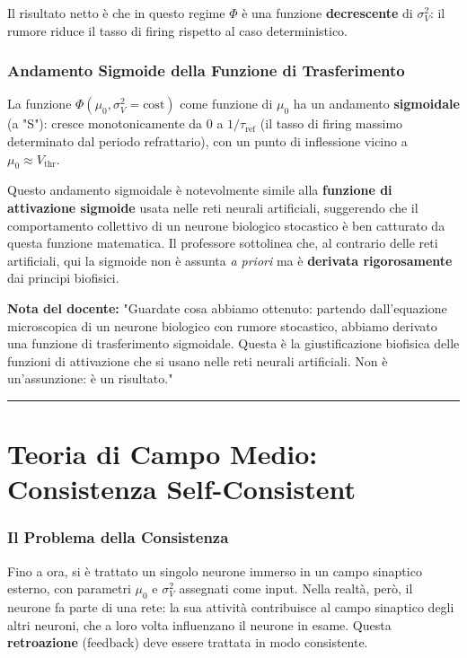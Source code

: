 Il risultato netto è che in questo regime $\Phi$ è una funzione \textbf{decrescente} di $\sigma_V^2$: il rumore riduce il tasso di firing rispetto al caso deterministico.

\subsubsection{Andamento Sigmoide della Funzione di Trasferimento}

La funzione $\Phi(\mu_0, \sigma_V^2 = \text{cost})$ come funzione di $\mu_0$ ha un andamento \textbf{sigmoidale} (a "S"): cresce monotonicamente da 0 a $1/\tau_{\text{ref}}$ (il tasso di firing massimo determinato dal periodo refrattario), con un punto di inflessione vicino a $\mu_0 \approx V_{\text{thr}}$.

Questo andamento sigmoidale è notevolmente simile alla \textbf{funzione di attivazione sigmoide} usata nelle reti neurali artificiali, suggerendo che il comportamento collettivo di un neurone biologico stocastico è ben catturato da questa funzione matematica. Il professore sottolinea che, al contrario delle reti artificiali, qui la sigmoide non è assunta \textit{a priori} ma è \textbf{derivata rigorosamente} dai principi biofisici.

\begin{tcolorbox}[colback=gray!5, colframe=gray!40, arc=2mm, boxrule=0.5pt]
\textbf{Nota del docente:} "Guardate cosa abbiamo ottenuto: partendo dall'equazione microscopica di un neurone biologico con rumore stocastico, abbiamo derivato una funzione di trasferimento sigmoidale. Questa è la giustificazione biofisica delle funzioni di attivazione che si usano nelle reti neurali artificiali. Non è un'assunzione: è un risultato."
\end{tcolorbox}

\vspace{0.5cm}
\noindent\rule{\textwidth}{0.4pt}
\vspace{0.5cm}

\section{Teoria di Campo Medio: Consistenza Self-Consistent}

\subsubsection{Il Problema della Consistenza}

Fino a ora, si è trattato un singolo neurone immerso in un campo sinaptico esterno, con parametri $\mu_0$ e $\sigma_V^2$ assegnati come input. Nella realtà, però, il neurone fa parte di una rete: la sua attività contribuisce al campo sinaptico degli altri neuroni, che a loro volta influenzano il neurone in esame. Questa \textbf{retroazione} (feedback) deve essere trattata in modo consistente.

